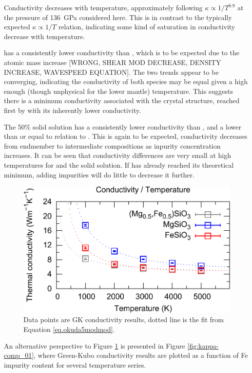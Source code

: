 Conductivity decreases with temperature, approximately following $\kappa \propto 1/T^{0.9}$ at the pressure of 136~GPa considered here. This is in contrast to the typically expected $\kappa \propto 1/T$ relation, indicating some kind of saturation in conductivity decrease with temperature.

\fesios has a consistently lower conductivity than \mgsio, which is to be expected due to the atomic mass increase [WRONG, SHEAR MOD DECREASE, DENSITY INCREASE, WAVESPEED EQUATION]. The two trends appear to be converging, indicating the conductivity of both species may be equal given a high enough (though unphysical for the lower mantle) temperature. This suggests there is a minimum conductivity associated with the crystal structure, reached first by \fesios with its inherently lower conductivity.

The 50\% solid solution has a consistently lower conductivity than \mgsio, and a lower than or equal to relation to \fesios. This is again to be expected, conductivity decreases from endmember to intermediate compositions as inpurity concentration increases. It can be seen that conductivity differences are very small at high temperatures for \fesios and the solid solution. If \fesios has already reached its theoretical minimum, adding impurities will do little to decrease it further.

\begin{figure}[h!]
  \includegraphics[width=\linewidth]{Figures/k-t_all_02.png}
  \caption{Data points are GK conductivity results, dotted line is the fit from Equation \ref{eq.okuda5modmod}.}
  \label{fig:kappa-temp_01}
\end{figure}

An alternative perspective to Figure \ref{fig:kappa-temp_01} is presented in Figure \ref{fig:kappa-comp_01}, where Green-Kubo conductivity results are plotted as a function of Fe impurity content for several temperature series.

